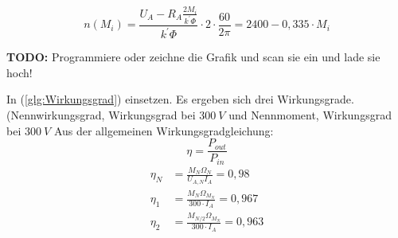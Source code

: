 \begin{solution}
\begin{compactenum}
\begin{equation}
n(M_i) = \frac{U_A - R_A \frac{2 M_i}{k^{'} \Phi}}{k^{'}\Phi} \cdot 2 \cdot \frac{60}{2 \pi} =2400-0,335 \cdot M_i
\end{equation}
\item \textbf{TODO:} Programmiere oder zeichne die Grafik und scan sie ein und lade sie hoch!
\item In (\ref{glg:Wirkungsgrad}) einsetzen. Es ergeben sich drei Wirkungsgrade. (Nennwirkungsgrad, Wirkungsgrad bei $300~V$ und Nennmoment, Wirkungsgrad bei $300~V$ 
Aus der allgemeinen Wirkungsgradgleichung:
\[\eta = \frac{P_{out}}{P_{in}}\]
\begin{align}
\eta_N &= \frac{M_N \Omega_N}{U_{A,N} I_A} = 0,98\\
\eta_1 &= \frac{M_N \Omega_{M_N}}{300 \cdot I_A} = 0,967\\
\eta_2 &= \frac{M_{N/2} \Omega_{M_N}}{300 \cdot I_A} = 0,963
\end{align}
\end{compactenum}
\end{solution}